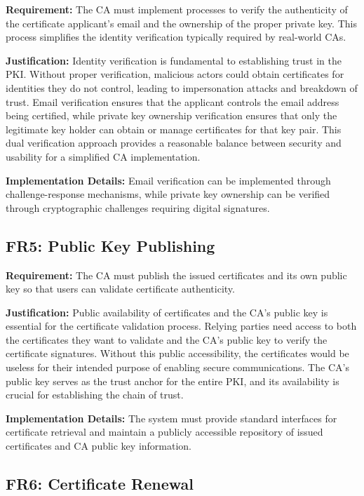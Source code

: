 \textbf{Requirement:} The CA must implement processes to verify the authenticity of the certificate applicant's email and the ownership of the proper private key. This process simplifies the identity verification typically required by real-world CAs.

\textbf{Justification:} Identity verification is fundamental to establishing trust in the PKI. Without proper verification, malicious actors could obtain certificates for identities they do not control, leading to impersonation attacks and breakdown of trust. Email verification ensures that the applicant controls the email address being certified, while private key ownership verification ensures that only the legitimate key holder can obtain or manage certificates for that key pair. This dual verification approach provides a reasonable balance between security and usability for a simplified CA implementation.

\textbf{Implementation Details:} Email verification can be implemented through challenge-response mechanisms, while private key ownership can be verified through cryptographic challenges requiring digital signatures.

\subsection{FR5: Public Key Publishing}

\textbf{Requirement:} The CA must publish the issued certificates and its own public key so that users can validate certificate authenticity.

\textbf{Justification:} Public availability of certificates and the CA's public key is essential for the certificate validation process. Relying parties need access to both the certificates they want to validate and the CA's public key to verify the certificate signatures. Without this public accessibility, the certificates would be useless for their intended purpose of enabling secure communications. The CA's public key serves as the trust anchor for the entire PKI, and its availability is crucial for establishing the chain of trust.

\textbf{Implementation Details:} The system must provide standard interfaces for certificate retrieval and maintain a publicly accessible repository of issued certificates and CA public key information.

\subsection{FR6: Certificate Renewal}

